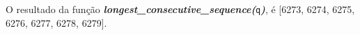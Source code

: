 \documentclass[12pt,varwidth=16cm,border=1pt]{standalone}
\begin{document}
O resultado da função \textbf{\textit{longest\_consecutive\_sequence(}}\verb+q+\textbf{\textit{)}}, é [6273, 6274, 6275, 6276, 6277, 6278, 6279].

\questiomtrue
\end{document}
